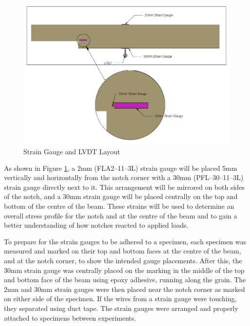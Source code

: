 \documentclass[11pt,a4paper]{article}
\numberwithin{equation}{subsection}
\begin{document}
\begin{figure}[h]
	\begin{center}
		\includegraphics[scale=0.4]{Gauge_Set_Up}
	\end{center}
	\caption{Strain Gauge and LVDT Layout}
	\label{fig:Gauge}
\end{figure}

\noindent
As shown in Figure \ref{fig:Gauge}, a 2mm (FLA2--11--3L) strain gauge will be placed 5mm vertically and horizontally from the notch corner with a 30mm (PFL--30--11--3L) strain gauge directly next to it. This arrangement will be mirrored on both sides of the notch, and a 30mm strain gauge will be placed centrally on the top and bottom of the centre of the beam. These strains will be used to determine an overall stress profile for the notch and at the centre of the beam and to gain a better understanding of how notches reacted to applied loads. 

\vspace*{\baselineskip}

\noindent
To prepare for the strain gauges to be adhered to a specimen, each specimen was measured and marked on their top and bottom faces at the centre of the beam, and at the notch corner, to show the intended gauge placements. After this, the 30mm strain gauge was centrally placed on the marking in the middle of the top and bottom face of the beam using epoxy adhesive, running along the grain. The 2mm and 30mm strain gauges were then placed near the notch corner as marked on either side of the specimen. If the wires from a strain gauge were touching, they separated using duct tape. The strain gauges were arranged and properly attached to specimens between experiments.
\end{document}
